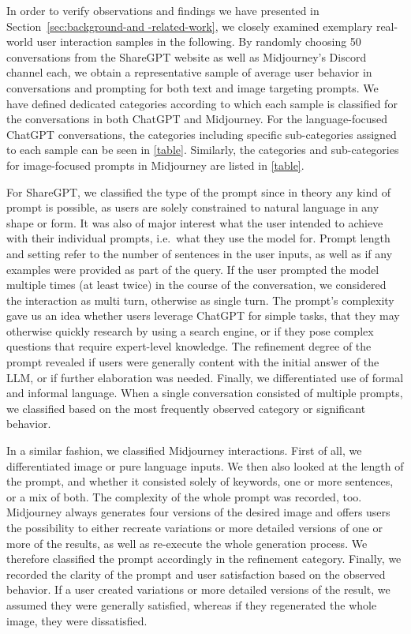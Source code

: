 In order to verify observations and findings we have presented in Section~\ref{sec:background-and
-related-work},
we closely examined exemplary real-world user interaction samples in the following.
By randomly choosing 50 conversations from the ShareGPT website as well as Midjourney's Discord
channel each, we obtain a representative sample of average user behavior in conversations and
prompting for both text and image targeting prompts.
We have defined dedicated categories according to which each sample is classified for the
conversations in both ChatGPT and Midjourney.
For the language-focused ChatGPT conversations, the categories including specific sub-categories assigned to each sample can be seen in \ref{table}.
Similarly, the categories and sub-categories for image-focused prompts in Midjourney are listed
in \ref{table}.

For ShareGPT, we classified the type of the prompt since in theory any kind of prompt is possible,
as users are solely constrained to natural language in any shape or form.
It was also of major interest what the user intended to achieve with their individual prompts,
i.e.\ what they use the model for.
Prompt length and setting refer to the number of sentences in the user inputs, as well as if any
examples were provided as part of the query.
If the user prompted the model multiple times (at least twice) in the course of the conversation, we considered the interaction as multi turn, otherwise as single turn.
The prompt's complexity gave us an idea whether users leverage ChatGPT for simple
tasks, that they may otherwise quickly research by using a search engine, or if they pose complex
questions that require expert-level knowledge.
The refinement degree of the prompt revealed if users were generally content with the initial
answer of the LLM, or if further elaboration was needed.
Finally, we differentiated use of formal and informal language.
When a single conversation consisted of multiple prompts, we classified based on the most
frequently observed category or significant behavior.

In a similar fashion, we classified Midjourney interactions.
First of all, we differentiated image or pure language inputs.
We then also looked at the length of the prompt, and whether it consisted solely of keywords, one
or more sentences, or a mix of both.
The complexity of the whole prompt was recorded, too.
Midjourney always generates four versions of the desired image and offers users the
possibility to either recreate variations or more detailed versions of one or more of the results,
as well as re-execute the whole generation process.
We therefore classified the prompt accordingly in the refinement category.
Finally, we recorded the clarity of the prompt and user satisfaction based
on the observed behavior.
If a user created variations or more detailed versions of the result, we assumed they were
generally satisfied, whereas if they regenerated the whole image, they were dissatisfied.

